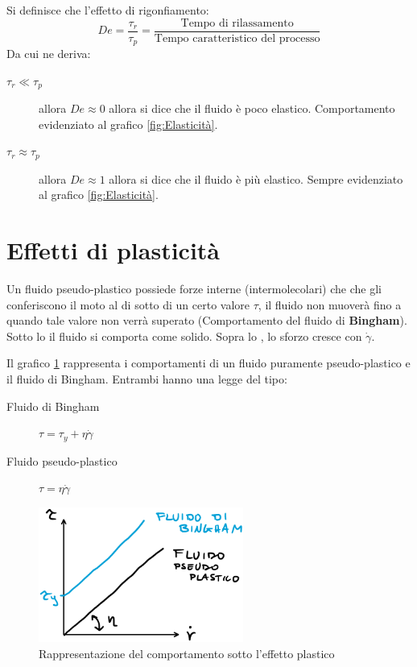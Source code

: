 Si definisce che l'effetto di rigonfiamento:
\begin{equation}
De = \frac{\tau_r}{\tau_p} = \frac{\text{Tempo di rilassamento}}{\text{Tempo caratteristico del processo}}
\end{equation}
Da cui ne deriva:
\begin{description}
\item[$\tau_r \ll \tau_p$] allora $De \approx 0$ allora si dice che il fluido è poco elastico. Comportamento evidenziato al grafico \ref{fig:Elasticità}.
\item[$\tau_r \approx \tau_p$] allora $De \approx 1$ allora si dice che il fluido è più elastico. Sempre evidenziato al grafico \ref{fig:Elasticità}.
\end{description}

\section{Effetti di plasticità}
Un fluido pseudo-plastico possiede forze interne (intermolecolari) che che gli conferiscono il moto al di sotto di un certo valore $\tau$, il fluido non muoverà fino a quando tale valore non verrà superato (Comportamento del fluido di \textbf{Bingham}). 
Sotto lo  il fluido si comporta come solido.
Sopra lo , lo sforzo cresce con $\dot{\gamma}$.

Il grafico \ref{fig:EffettoPlastico} rappresenta i comportamenti di un fluido puramente pseudo-plastico e il fluido di Bingham.
Entrambi hanno una legge del tipo:
\begin{description}
\item[Fluido di Bingham] $\tau = \tau_y + \eta \dot{\gamma}$
\item[Fluido pseudo-plastico] $\tau = \eta \dot{\gamma}$
\end{description}

\begin{figure}
\centering
\includegraphics[width = 0.6\textwidth]{gfx/EffettoPlastico}
\caption{Rappresentazione del comportamento sotto l'effetto plastico}
\label{fig:EffettoPlastico}
\end{figure}

